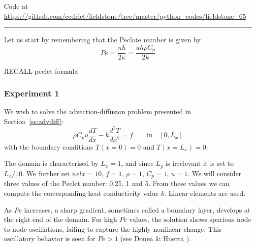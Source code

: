 

\begin{center}
Code at \url{https://github.com/cedrict/fieldstone/tree/master/python_codes/fieldstone_65}
\end{center}

\par\noindent\rule{\textwidth}{0.4pt}

Let us start by remembering that the Peclate number is given by 
\[
Pe = \frac{uh}{2\kappa} = \frac{uh\rho C_p}{2 k}
\]

RECALL peclet formula

\subsubsection*{Experiment 1}
We wish to solve the advection-diffusion problem presented in 
Section~\ref{ss:advdiff}:
\begin{equation}
\rho C_p u \frac{dT}{dx} - k \frac{d^2T}{dx^2} = f \qquad \text{in} \quad [0,L_x]
\end{equation}
with the boundary conditions $T(x=0)=0$ and $T(x=L_x)=0$.

The domain is characterised by $L_x=1$, and since $L_y$ is irrelevant it is set to $L_x/10$.
We further set $nelx=10$, $f=1$, $\rho=1$, $C_p=1$, $u=1$.
We will consider three values of the Peclet number: 0.25, 1 and 5.
From these values we can compute the corresponding heat conductivity value $k$.
Linear elements are used.

As $Pe$ increases, a sharp gradient, sometimes called a boundary layer,
develops at the right end of the domain. For high $Pe$ values, the solution shows 
spurious node to node oscillations, failing to capture the highly nonlinear change. This oscillatory
behavior is seen for $Pe>1$ (see Donea \& Huerta \cite{dohu03}).


